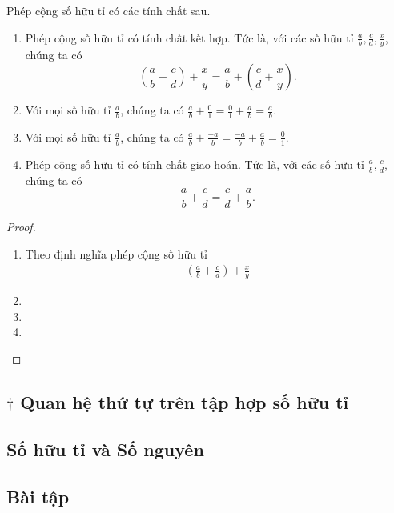 \begin{theorem}
	Phép cộng số hữu tỉ có các tính chất sau.
	\begin{enumerate}[label={(\roman*)}]
		\item Phép cộng số hữu tỉ có tính chất kết hợp. Tức là, với các số hữu tỉ $\frac{a}{b}, \frac{c}{d}, \frac{x}{y}$, chúng ta có
		      \[
			      \left(\frac{a}{b} + \frac{c}{d}\right) + \frac{x}{y} = \frac{a}{b} + \left(\frac{c}{d} + \frac{x}{y}\right).
		      \]
		\item Với mọi số hữu tỉ $\frac{a}{b}$, chúng ta có $\frac{a}{b} + \frac{0}{1} = \frac{0}{1} + \frac{a}{b} = \frac{a}{b}$.
		\item Với mọi số hữu tỉ $\frac{a}{b}$, chúng ta có $\frac{a}{b} + \frac{-a}{b} = \frac{-a}{b} + \frac{a}{b} = \frac{0}{1}$.
		\item Phép cộng số hữu tỉ có tính chất giao hoán. Tức là, với các số hữu tỉ $\frac{a}{b}, \frac{c}{d}$, chúng ta có
		      \[
			      \frac{a}{b} + \frac{c}{d} = \frac{c}{d} + \frac{a}{b}.
		      \]
	\end{enumerate}
\end{theorem}

\begin{proof}
	\begin{enumerate}[label={(\roman*)}]
		\item Theo định nghĩa phép cộng số hữu tỉ
		      \begin{align*}
			      \left(\frac{a}{b} + \frac{c}{d}\right) + \frac{x}{y}
		      \end{align*}
		\item
		\item
		\item
	\end{enumerate}
\end{proof}

\begin{definition}
\end{definition}

\begin{definition}
\end{definition}

\begin{theorem}
\end{theorem}

\begin{definition}
\end{definition}

\subsection*{$\dagger$ Quan hệ thứ tự trên tập hợp số hữu tỉ}

\subsection*{Số hữu tỉ và Số nguyên}

\subsection*{Bài tập}
